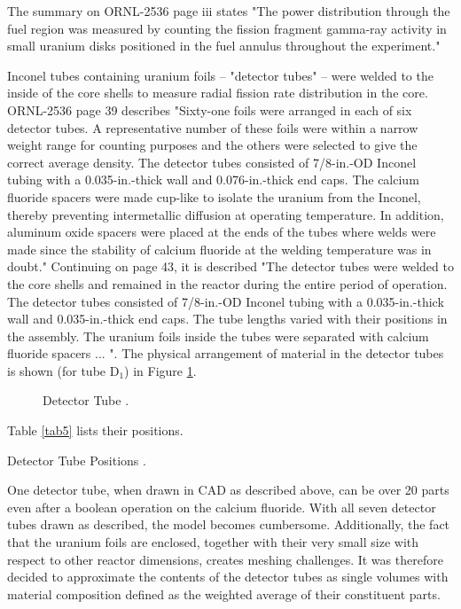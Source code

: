 \documentclass[ms,a4paper]{memoir}
\newcommand*{\msrarchive}{../../msr-archive}%
\begin{document}
The summary on ORNL-2536 page iii states "The power distribution through the fuel region was measured by counting the fission fragment  gamma-ray activity in small uranium disks positioned in the fuel annulus throughout the experiment."


Inconel tubes containing uranium foils -- "detector tubes" -- were welded to the inside of the core shells to measure radial fission rate distribution in the core. ORNL-2536 page 39 describes "Sixty-one foils were arranged in each of six detector tubes. A representative number of these foils were within a narrow weight range for counting purposes and the others were selected to give the correct average density. The detector tubes consisted of 7/8-in.-OD Inconel tubing with a 0.035-in.-thick wall and 0.076-in.-thick end caps. The calcium fluoride spacers were made cup-like to isolate the uranium from the Inconel, thereby preventing intermetallic diffusion at operating temperature. In addition, aluminum oxide spacers were placed at the ends of the tubes where welds were made since the stability of calcium fluoride at the welding temperature was in doubt." Continuing on page 43, it is described "The detector tubes were welded to the core shells and remained in the reactor during the entire period of operation. The detector tubes consisted of 7/8-in.-OD Inconel tubing with a 0.035-in.-thick wall and 0.035-in.-thick end caps. The tube lengths varied with their positions in the assembly. The uranium foils inside the tubes were separated with calcium fluoride spacers ... ". The physical arrangement of material in the detector tubes is shown (for tube D$_1$) in Figure \ref{fig7}.

\begin{figure}[H]
  \centering
  \caption{Detector Tube \parencite[Figure 21]{ornl-2536}.}
  \label{fig7}
\end{figure}

Table \ref{tab5} lists their positions.

\begin{table}[H]
  \centering
  \caption{Detector Tube Positions \parencite[Table 15]{ornl-2536}.}
  \label{tab5}
\end{table}

One detector tube, when drawn in CAD as described above, can be over 20 parts even after a boolean operation on the calcium fluoride. With all seven detector tubes drawn as described, the model becomes cumbersome. Additionally, the fact that the uranium foils are enclosed, together with their very small size with respect to other reactor dimensions, creates meshing challenges. It was therefore decided to approximate the contents of the detector tubes as single volumes with material composition defined as the weighted average of their constituent parts.
\end{document}
